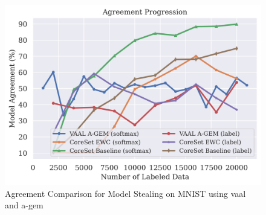 \begin{figure}[!htb]
    \centering
    \includegraphics[width=0.5\linewidth]{images/results_CALMS/mnist_vaal_agem.png}
    \caption{Agreement Comparison for Model Stealing on MNIST using \gls{vaal} and \gls{a-gem}}
    \label{fig:CALMSmnistVAAL_AGEM}
\end{figure}